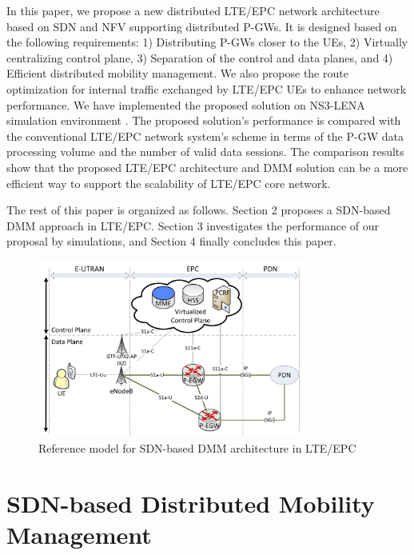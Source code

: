 \documentclass[runningheads,a4paper]{llncs}
\begin{document}
In this paper, we propose a new distributed LTE/EPC network architecture based on SDN and NFV supporting distributed P-GWs. It is designed based on the following requirements: 1) Distributing P-GWs closer to the UEs, 2) Virtually centralizing control plane, 3) Separation of the control and data planes, and 4) Efficient distributed mobility management. We also propose the route optimization for internal traffic exchanged by LTE/EPC UEs to enhance network performance. We have implemented the proposed solution on NS3-LENA simulation environment \cite{ref13-1}. The proposed solution's performance is compared with the conventional LTE/EPC network system's scheme in terms of the P-GW data processing volume and the number of valid data sessions. The comparison results show that the proposed LTE/EPC architecture and DMM solution can be a more efficient way to support the scalability of LTE/EPC core network.

The rest of this paper is organized as follows. Section 2 proposes a SDN-based DMM approach in LTE/EPC. Section 3 investigates the performance of our proposal by simulations, and Section 4 finally concludes this paper.

\begin{figure}[t]
\begin{center}
\includegraphics[width=9cm]{figures/fig1.pdf}
\end{center}\vspace{-0.3cm}
\caption{Reference model for SDN-based DMM architecture in LTE/EPC}
\label{fig:f1}\vspace{-0.6cm}
\end{figure}


\section{SDN-based Distributed Mobility Management}
\end{document}
